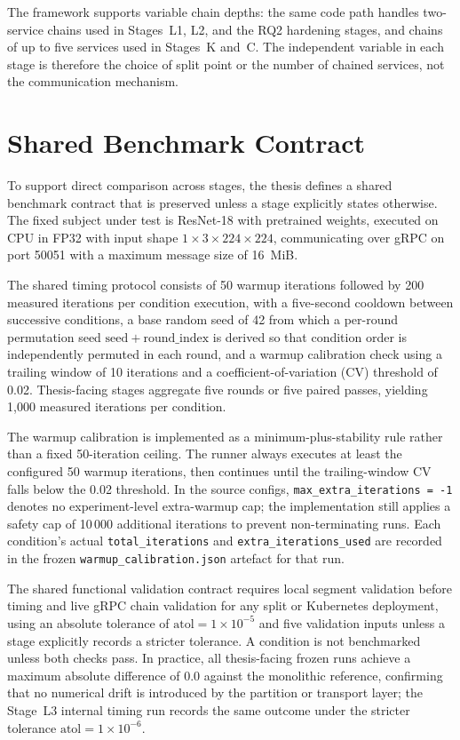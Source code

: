 The framework supports variable chain depths: the same code path handles two-service
chains used in Stages~L1, L2, and the RQ2 hardening stages, and chains of up to five
services used in Stages~K and~C.
The independent variable in each stage is therefore the choice of split point or the
number of chained services, not the communication mechanism.

\section{Shared Benchmark Contract}
\label{sec:methods-contract}

To support direct comparison across stages, the thesis defines a shared benchmark
contract that is preserved unless a stage explicitly states otherwise.
The fixed subject under test is ResNet-18 with pretrained weights, executed on CPU in
FP32 with input shape $1 \times 3 \times 224 \times 224$, communicating over gRPC on
port 50051 with a maximum message size of 16~MiB.

The shared timing protocol consists of 50 warmup iterations followed by 200 measured
iterations per condition execution, with a five-second cooldown between successive
conditions, a base random seed of 42 from which a per-round permutation seed
$\mathrm{seed} + \mathrm{round\_index}$ is derived so that condition order is independently
permuted in each round, and a warmup calibration check using a trailing window of 10
iterations and a coefficient-of-variation (CV) threshold of 0.02.
Thesis-facing stages aggregate five rounds or five paired passes, yielding 1,000 measured
iterations per condition.

The warmup calibration is implemented as a minimum-plus-stability rule rather than a
fixed 50-iteration ceiling.
The runner always executes at least the configured 50 warmup iterations, then continues
until the trailing-window CV falls below the 0.02 threshold.
In the source configs, \texttt{max\_extra\_iterations = -1} denotes no experiment-level
extra-warmup cap; the implementation still applies a safety cap of 10\,000 additional
iterations to prevent non-terminating runs.
Each condition's actual \texttt{total\_iterations} and
\texttt{extra\_iterations\_used} are recorded in the frozen
\texttt{warmup\_calibration.json} artefact for that run.

The shared functional validation contract requires local segment validation before
timing and live gRPC chain validation for any split or Kubernetes deployment, using an
absolute tolerance of $\text{atol} = 1 \times 10^{-5}$ and five validation inputs
unless a stage explicitly records a stricter tolerance.
A condition is not benchmarked unless both checks pass.
In practice, all thesis-facing frozen runs achieve a maximum absolute difference of 0.0
against the monolithic reference, confirming that no numerical drift is introduced by
the partition or transport layer; the Stage~L3 internal timing run records the same outcome
under the stricter tolerance $\text{atol}=1\times10^{-6}$.

